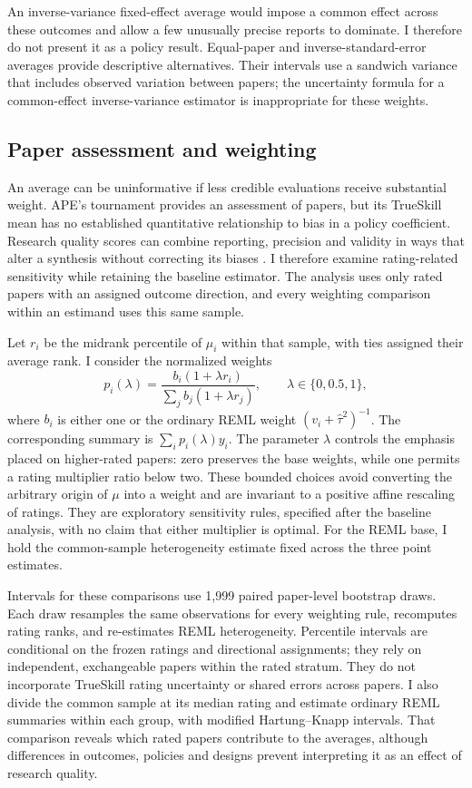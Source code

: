 \documentclass[11pt]{article}
\begin{document}
An inverse-variance fixed-effect average would impose a common effect across these outcomes and allow a few unusually precise reports to dominate. I therefore do not present it as a policy result. Equal-paper and inverse-standard-error averages provide descriptive alternatives. Their intervals use a sandwich variance that includes observed variation between papers; the uncertainty formula for a common-effect inverse-variance estimator is inappropriate for these weights.

\subsection{Paper assessment and weighting}
An average can be uninformative if less credible evaluations receive substantial weight. APE's tournament provides an assessment of papers, but its TrueSkill mean has no established quantitative relationship to bias in a policy coefficient. Research quality scores can combine reporting, precision and validity in ways that alter a synthesis without correcting its biases \citep{juni,boutron}. I therefore examine rating-related sensitivity while retaining the baseline estimator. The analysis uses only rated papers with an assigned outcome direction, and every weighting comparison within an estimand uses this same sample.

Let $r_i$ be the midrank percentile of $\mu_i$ within that sample, with ties assigned their average rank. I consider the normalized weights
\begin{equation}\label{eq:ratingweights}
 p_i(\lambda)=\frac{b_i(1+\lambda r_i)}{\sum_j b_j(1+\lambda r_j)},
 \qquad \lambda\in\{0,0.5,1\},
\end{equation}
where $b_i$ is either one or the ordinary REML weight $(v_i+\widehat\tau^2)^{-1}$. The corresponding summary is $\sum_i p_i(\lambda)y_i$. The parameter $\lambda$ controls the emphasis placed on higher-rated papers: zero preserves the base weights, while one permits a rating multiplier ratio below two. These bounded choices avoid converting the arbitrary origin of $\mu$ into a weight and are invariant to a positive affine rescaling of ratings. They are exploratory sensitivity rules, specified after the baseline analysis, with no claim that either multiplier is optimal. For the REML base, I hold the common-sample heterogeneity estimate fixed across the three point estimates.

Intervals for these comparisons use 1,999 paired paper-level bootstrap draws. Each draw resamples the same observations for every weighting rule, recomputes rating ranks, and re-estimates REML heterogeneity. Percentile intervals are conditional on the frozen ratings and directional assignments; they rely on independent, exchangeable papers within the rated stratum. They do not incorporate TrueSkill rating uncertainty or shared errors across papers. I also divide the common sample at its median rating and estimate ordinary REML summaries within each group, with modified Hartung--Knapp intervals. That comparison reveals which rated papers contribute to the averages, although differences in outcomes, policies and designs prevent interpreting it as an effect of research quality.
\end{document}
